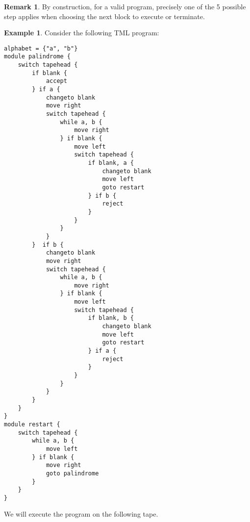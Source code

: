\documentclass{article}
\theoremstyle{definition}
\newtheorem{remark}[rules]{Remark}
\newtheorem{example}[rules]{Example}
\begin{document}
    \begin{remark}
        By construction, for a valid program, precisely one of the 5 possible step applies when choosing the next block to execute or terminate.
    \end{remark}
    
    \begin{example}
        Consider the following TML program:
\begin{lstlisting}[language=TML]
alphabet = {"a", "b"}
module palindrome {
    switch tapehead {
        if blank {
            accept
        } if a {
            changeto blank
            move right
            switch tapehead {
                while a, b {
                    move right
                } if blank {
                    move left
                    switch tapehead {
                        if blank, a {
                            changeto blank
                            move left
                            goto restart
                        } if b {
                            reject
                        }
                    }
                }
            }
        }  if b {
            changeto blank
            move right
            switch tapehead {
                while a, b {
                    move right
                } if blank {
                    move left
                    switch tapehead {
                        if blank, b {
                            changeto blank
                            move left
                            goto restart
                        } if a {
                            reject
                        }
                    }
                }
            }
        }
    }
}
module restart {
    switch tapehead {
        while a, b {
            move left
        } if blank {
            move right
            goto palindrome
        }
    }
}
\end{lstlisting}
    We will execute the program on the following tape.
    \begin{figure}[H]
        \centering
\end{figure}
\end{example}
\end{document}
